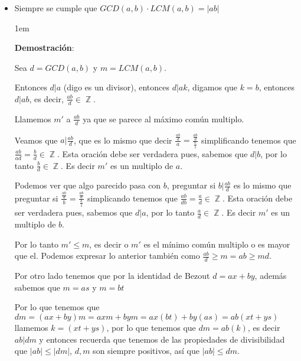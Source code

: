 \documentclass[12pt]{report}                                    %
\newenvironment{SmallIndentation}[1][0.75em]                    %
    {\begin{adjustwidth}{#1}{}\begin{footnotesize}}                 %
    {\end{footnotesize}\end{adjustwidth}}                           %
\DeclareMathOperator \Integers  {\mathbb{Z}}                     %
\begin{document}
            \begin{itemize}

                \item Siempre se cumple que $GCD(a,b) \cdot LCM(a,b) = |ab|$

                    \begin{SmallIndentation}[1em]
                        \textbf{Demostración}:

                        Sea $d = GCD(a,b)$ y $m = LCM(a,b)$.

                        Entonces $d|a$ (digo es un divisor), entonces $d|ak$, digamos que
                        $k=b$, entonces $d|ab$, es decir, $\frac{ab}{d} \in \Integers$.

                        Llamemos $m'$ a $\frac{ab}{d}$ ya que se parece al máximo común multiplo.

                        Veamos que $a|\frac{ab}{d}$, que es lo mismo que decir
                        $\frac{\frac{ab}{d}}{a} = \frac{\frac{ab}{d}}{\frac{a}{1}}$
                        simplificando tenemos que $\frac{ab}{ad} = \frac{b}{d} \in \Integers$.
                        Esta oración debe ser verdadera pues, sabemos que $d|b$,
                        por lo tanto $\frac{b}{d} \in \Integers$. Es decir $m'$ es un multiplo
                        de $a$.

                        Podemos ver que algo parecido pasa con $b$, preguntar si $b|\frac{ab}{d}$
                        es lo mismo que preguntar si  $\frac{\frac{ab}{d}}{b} = \frac{\frac{ab}{d}}{\frac{b}{1}}$
                        simplicando tenemos que  $\frac{ab}{db} = \frac{a}{d} \in \Integers$.
                        Esta oración debe ser verdadera pues, sabemos que $d|a$,
                        por lo tanto $\frac{a}{d} \in \Integers$. Es decir $m'$ es un multiplo
                        de $b$.

                        Por lo tanto $m' \leq m$, es decir o $m'$ es el mínimo común multiplo
                        o es mayor que el. Podemos expresar lo anterior también como 
                        $\frac{ab}{d} \geq m = ab \geq md$.

                        Por otro lado tenemos que por la identidad de Bezout $d=ax+by$,
                        además sabemos que $m=as$ y $m=bt$ 

                        Por lo que tenemos que 
                        $dm = (ax+by)m = axm + bym = ax(bt) + by(as) = ab(xt+ys)$ llamemos
                        $k=(xt+ys)$, por lo que tenemos que $dm = ab(k)$, es decir $ab|dm$
                        y entonces recuerda que tenemos de las propiedades de divisibilidad
                        que $|ab| \leq |dm|$, $d,m$ son siempre positivos, así que 
                        $|ab| \leq dm$.


\end{SmallIndentation}
\end{itemize}
\end{document}
